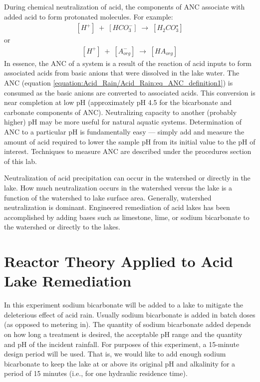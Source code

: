 \documentclass[letterpaper,10pt,english]{sphinxmanual}
\begin{document}
During chemical neutralization of acid, the components of ANC associate with added acid to form protonated molecules. For example:
\begin{equation}\label{equation:Acid_Rain/Acid_Rain:Acid_Rain/Acid_Rain:3}
\begin{split}\left[{H}^{+} \right]{\; }+{\; }\left[{HCO}_{{3}}^{{-}} \right]{\; }\to \; \left[{H}_{{2}} {CO}_{{3}}^{{\star}} \right]\end{split}
\end{equation}
or
\begin{equation}\label{equation:Acid_Rain/Acid_Rain:Acid_Rain/Acid_Rain:4}
\begin{split}\left[{H}^{+} \right]{\; }+{\; }\left[{A}_{{org}}^{{-}} \right]{\; }\to \; \left[{HA}_{{org}} \right]\end{split}
\end{equation}
In essence, the ANC of a system is a result of the reaction of acid inputs to form associated acids from basic anions that were dissolved in the lake water. The ANC (equation \eqref{equation:Acid_Rain/Acid_Rain:eq_ANC_definition1}) is consumed as the basic anions are converted to associated acids. This conversion is near completion at low pH (approximately pH 4.5 for the bicarbonate and carbonate components of ANC). Neutralizing capacity to another (probably higher) pH may be more useful for natural aquatic systems. Determination of ANC to a particular pH is fundamentally easy — simply add and measure the amount of acid required to lower the sample pH from its initial value to the pH of interest. Techniques to measure ANC are described under the procedures section of this lab.

Neutralization of acid precipitation can occur in the watershed or directly in the lake. How much neutralization occurs in the watershed versus the lake is a function of the watershed to lake surface area. Generally, watershed neutralization is dominant. Engineered remediation of acid lakes has been accomplished by adding bases such as limestone, lime, or sodium bicarbonate to the watershed or directly to the lakes.


\section{Reactor Theory Applied to Acid Lake Remediation}
\label{\detokenize{Acid_Rain/Acid_Rain:reactor-theory-applied-to-acid-lake-remediation}}\label{\detokenize{Acid_Rain/Acid_Rain:heading-acid-rain-reactor-theory-applied-to-acid-lake-remediation}}
In this experiment sodium bicarbonate will be added to a lake to mitigate the deleterious effect of acid rain. Usually sodium bicarbonate is added in batch doses (as opposed to metering in). The quantity of sodium bicarbonate added depends on how long a treatment is desired, the acceptable pH range and the quantity and pH of the incident rainfall. For purposes of this experiment, a 15-minute design period will be used. That is, we would like to add enough sodium bicarbonate to keep the lake at or above its original pH and alkalinity for a period of 15 minutes (i.e., for one hydraulic residence time).
\end{document}
